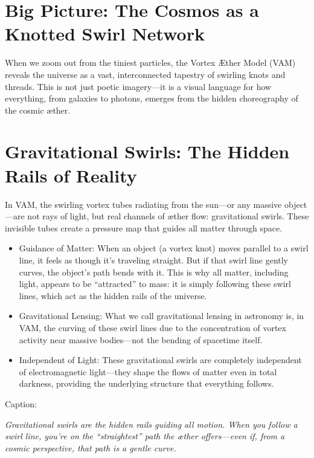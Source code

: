 
\section{Big Picture: The Cosmos as a Knotted Swirl Network}


When we zoom out from the tiniest particles, the Vortex Æther Model (VAM) reveals the universe as a vast, interconnected tapestry of swirling knots and threads. This is not just poetic imagery—it is a visual language for how everything, from galaxies to photons, emerges from the hidden choreography of the cosmic æther.


\section*{Gravitational Swirls: The Hidden Rails of Reality}

In VAM, the swirling vortex tubes radiating from the sun—or any massive object—are not rays of light, but real channels of æther flow: gravitational swirls. These invisible tubes create a pressure map that guides all matter through space.


\begin{itemize}

\item
Guidance of Matter: When an object (a vortex knot) moves parallel to a swirl line, it feels as though it’s traveling straight. But if that swirl line gently curves, the object’s path bends with it. This is why all matter, including light, appears to be “attracted” to mass: it is simply following these swirl lines, which act as the hidden rails of the universe.




\item
Gravitational Lensing: What we call gravitational lensing in astronomy is, in VAM, the curving of these swirl lines due to the concentration of vortex activity near massive bodies—not the bending of spacetime itself.




\item
Independent of Light: These gravitational swirls are completely independent of electromagnetic light—they shape the flows of matter even in total darkness, providing the underlying structure that everything follows.




\end{itemize}

Caption:

\textit{Gravitational swirls are the hidden rails guiding all motion. When you follow a swirl line, you’re on the “straightest” path the æther offers—even if, from a cosmic perspective, that path is a gentle curve.}


